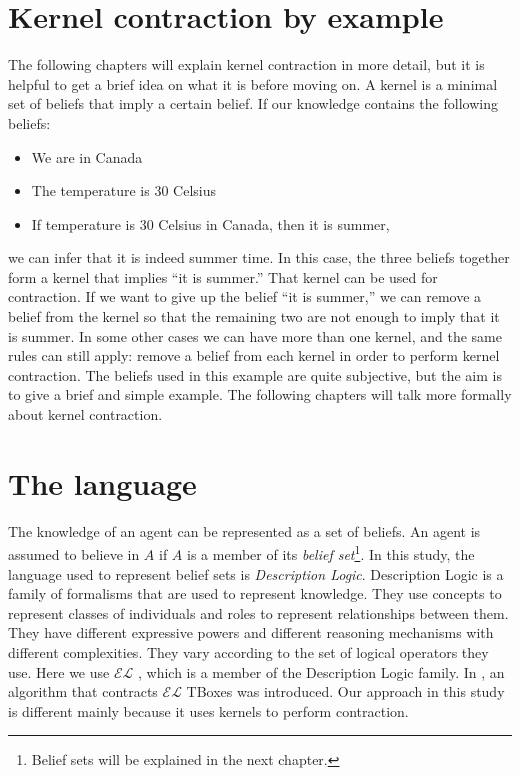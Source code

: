 \section{Kernel contraction by example}
The following chapters will explain kernel contraction in more detail, but it is helpful to get a brief idea on what it is before moving on. A kernel is a minimal set of beliefs that imply a certain belief. If our knowledge contains the following beliefs:
\begin{itemize}
\item We are in Canada
\item The temperature is 30 Celsius
\item If temperature is 30 Celsius in Canada, then it is summer,
\end{itemize}
we can infer that it is indeed summer time. In this case, the three beliefs together form a kernel that implies ``it is summer.'' That kernel can be used for contraction. If we want to give up the belief ``it is summer,'' we can remove a belief from the kernel so that the remaining two are not enough to imply that it is summer. In some other cases we can have more than one kernel, and the same rules can still apply: remove a belief from each kernel in order to perform kernel contraction. The beliefs used in this example are quite subjective, but the aim is to give a brief and simple example. The following chapters will talk more formally about kernel contraction.

\section{The language}
The knowledge of an agent can be represented as a set of beliefs. An agent is assumed to believe in $A$ if $A$ is a member of its \textit{belief set}\footnote{Belief sets will be explained in the next chapter.}. In this study, the language used to represent belief sets is \textit{Description Logic}. Description Logic is a family of formalisms that are used to represent knowledge. They use concepts to represent classes of individuals and roles to represent relationships between them. They have different expressive powers and different reasoning mechanisms with different complexities. They vary according to the set of logical operators they use. Here we use $\mathcal{EL}$ \cite{el}, which is a member of the Description Logic family. In \cite{contract}, an algorithm that contracts $\mathcal{EL}$ TBoxes was introduced. Our approach in this study is different mainly because it uses kernels to perform contraction.

